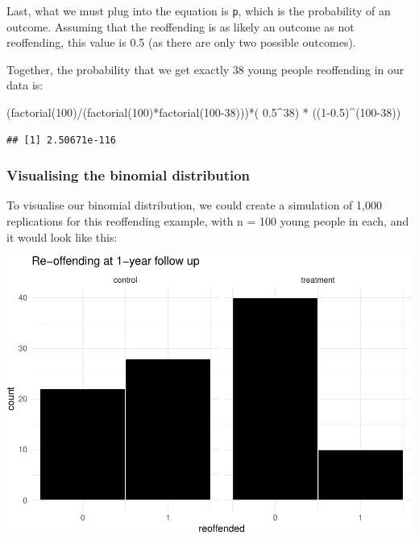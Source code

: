 \documentclass[
]{book}
\newenvironment{Shaded}{\begin{snugshade}}{\end{snugshade}}
\newcommand{\DecValTok}[1]{\textcolor[rgb]{0.00,0.00,0.81}{#1}}
\newcommand{\FloatTok}[1]{\textcolor[rgb]{0.00,0.00,0.81}{#1}}
\newcommand{\FunctionTok}[1]{\textcolor[rgb]{0.00,0.00,0.00}{#1}}
\newcommand{\NormalTok}[1]{#1}
\newcommand{\SpecialCharTok}[1]{\textcolor[rgb]{0.00,0.00,0.00}{#1}}
\begin{document}
Last, what we must plug into the equation is \texttt{p}, which is the probability of an outcome. Assuming that the reoffending is as likely an outcome as not reoffending, this value is 0.5 (as there are only two possible outcomes).

Together, the probability that we get exactly 38 young people reoffending in our data is:

\begin{Shaded}
\begin{Highlighting}[]
\NormalTok{(}\FunctionTok{factorial}\NormalTok{(}\DecValTok{100}\NormalTok{)}\SpecialCharTok{/}\NormalTok{(}\FunctionTok{factorial}\NormalTok{(}\DecValTok{100}\NormalTok{)}\SpecialCharTok{*}\FunctionTok{factorial}\NormalTok{(}\DecValTok{100{-}38}\NormalTok{)))}\SpecialCharTok{*}\NormalTok{( }\FloatTok{0.5}\SpecialCharTok{\^{}}\DecValTok{38}\NormalTok{) }\SpecialCharTok{*}\NormalTok{ ((}\DecValTok{1}\FloatTok{{-}0.5}\NormalTok{)}\SpecialCharTok{\^{}}\NormalTok{(}\DecValTok{100{-}38}\NormalTok{))}
\end{Highlighting}
\end{Shaded}

\begin{verbatim}
## [1] 2.50671e-116
\end{verbatim}

\hypertarget{visualising-the-binomial-distribution}{%
\subsubsection{Visualising the binomial distribution}\label{visualising-the-binomial-distribution}}

To visualise our binomial distribution, we could create a simulation of 1,000 replications for this reoffending example, with n = 100 young people in each, and it would look like this:

\includegraphics{06-hypotheses_files/figure-latex/unnamed-chunk-6-1.pdf}
\end{document}
